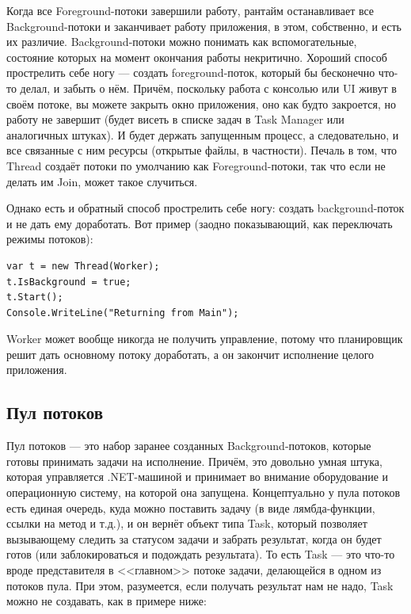 \documentclass[a5paper]{article}
\begin{document}
Когда все Foreground-потоки завершили работу, рантайм останавливает все Background-потоки и заканчивает работу приложения, в этом, собственно, и есть их различие. Background-потоки можно понимать как вспомогательные, состояние которых на момент окончания работы некритично. Хороший способ прострелить себе ногу --- создать foreground-поток, который бы бесконечно что-то делал, и забыть о нём. Причём, поскольку работа с консолью или UI живут в своём потоке, вы можете закрыть окно приложения, оно как будто закроется, но работу не завершит (будет висеть в списке задач в Task Manager или аналогичных штуках). И будет держать запущенным процесс, а следовательно, и все связанные с ним ресурсы (открытые файлы, в частности). Печаль в том, что Thread создаёт потоки по умолчанию как Foreground-потоки, так что если не делать им Join, может такое случиться.

Однако есть и обратный способ прострелить себе ногу: создать background-поток и не дать ему доработать. Вот пример (заодно показывающий, как переключать режимы потоков):

\begin{verbatim}
var t = new Thread(Worker);
t.IsBackground = true;
t.Start();
Console.WriteLine("Returning from Main");
\end{verbatim}

Worker может вообще никогда не получить управление, потому что планировщик решит дать основному потоку доработать, а он закончит исполнение целого приложения.

\subsection{Пул потоков}

Пул потоков --- это набор заранее созданных Background-потоков, которые готовы принимать задачи на исполнение. Причём, это довольно умная штука, которая управляется .NET-машиной и принимает во внимание оборудование и операционную систему, на которой она запущена. Концептуально у пула потоков есть единая очередь, куда можно поставить задачу (в виде лямбда-функции, ссылки на метод и т.д.), и он вернёт объект типа Task, который позволяет вызывающему следить за статусом задачи и забрать результат, когда он будет готов (или заблокироваться и подождать результата). То есть Task --- это что-то вроде представителя в <<главном>> потоке задачи, делающейся в одном из потоков пула. При этом, разумеется, если получать результат нам не надо, Task можно не создавать, как в примере ниже:
\end{document}
